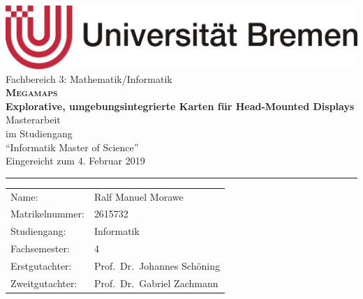 \begin{titlepage}
\begin{center}
    \includegraphics[width=0.5\linewidth]{figures/Universitaet_Bremen}\\\vspace{0.3cm}
    \large Fachbereich 3: Mathematik/Informatik\\
    \vspace{2cm}
    \LARGE\textsf{\textbf{\textsc{Megamaps}}}\\
    \Large\textsf{\textbf{Explorative, umgebungsintegrierte Karten für Head-Mounted Displays}} \\
    \vspace{2cm}
    \LARGE Masterarbeit\\
    \vspace{1cm}
    \large
    im Studiengang\\
    \enquote{Informatik Master of Science}\\
    \vspace{2cm}
    \normalsize
    Eingereicht zum 4. Februar 2019\\
    \vspace{3.5cm}
\end{center}
\vfill
\noindent
\hrule
\vspace{1em}
\begin{tabular}{ll}
    Name: & {Ralf Manuel Morawe} \\
    Matrikelnummer: & {2615732} \\
    Studiengang: & Informatik\\
    Fachsemester: & 4\\
    Erstgutachter: & {Prof.\ Dr.\ Johannes Schöning} \\
    Zweitgutachter: & {Prof.\ Dr.\ Gabriel Zachmann}
\end{tabular}
\end{titlepage}
\cleardoublepage
